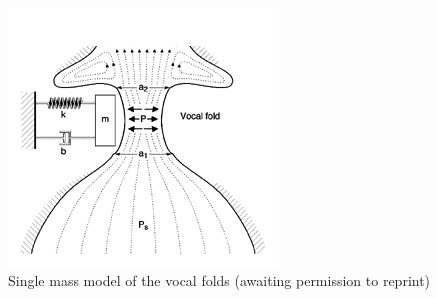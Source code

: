 \documentclass[12pt, letter]{report}
\begin{document}
\begin{figure}
\centering
\includegraphics[width=\linewidth]{vocal_folds_spring.png}
\caption{Single mass model of the vocal folds (awaiting permission to reprint)}
\label{fig:vocal_folds_spring}
\end{figure}



\end{document}

